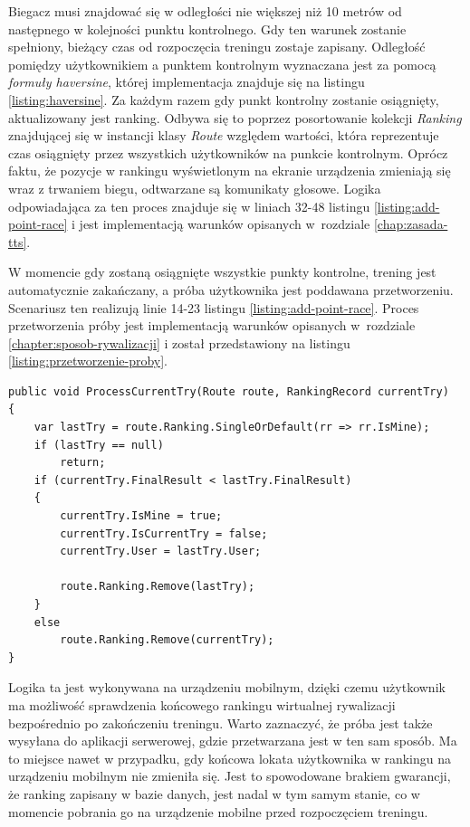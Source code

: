 Biegacz musi znajdować się w odległości nie większej niż 10 metrów od następnego w kolejności punktu kontrolnego. Gdy ten warunek zostanie spełniony, bieżący czas od rozpoczęcia treningu zostaje zapisany. Odległość pomiędzy użytkownikiem a punktem kontrolnym wyznaczana jest za pomocą \textit{formuły haversine}, której implementacja znajduje się na listingu \ref{listing:haversine}. Za każdym razem gdy punkt kontrolny zostanie osiągnięty, aktualizowany jest ranking. Odbywa się to poprzez posortowanie kolekcji \textit{Ranking} znajdującej się w instancji klasy \textit{Route} względem wartości, która reprezentuje czas osiągnięty przez wszystkich użytkowników na punkcie kontrolnym. Oprócz faktu, że pozycje w rankingu wyświetlonym na ekranie urządzenia zmieniają się wraz z trwaniem biegu, odtwarzane są komunikaty głosowe. Logika odpowiadająca za ten proces znajduje się w liniach 32-48 listingu \ref{listing:add-point-race} i jest implementacją warunków opisanych w~rozdziale \ref{chap:zasada-tts}.

W momencie gdy zostaną osiągnięte wszystkie punkty kontrolne, trening jest automatycznie zakańczany, a próba użytkownika jest poddawana przetworzeniu. Scenariusz ten realizują linie 14-23 listingu \ref{listing:add-point-race}. Proces przetworzenia próby jest implementacją warunków opisanych w~rozdziale \ref{chapter:sposob-rywalizacji} i został przedstawiony na listingu \ref{listing:przetworzenie-proby}.\\
\begin{lstlisting}[caption={Przetworzenie próby użytkownika},label=listing:przetworzenie-proby]
public void ProcessCurrentTry(Route route, RankingRecord currentTry)
{
    var lastTry = route.Ranking.SingleOrDefault(rr => rr.IsMine);
    if (lastTry == null) 
        return;
    if (currentTry.FinalResult < lastTry.FinalResult)
    {
        currentTry.IsMine = true;
        currentTry.IsCurrentTry = false;
        currentTry.User = lastTry.User;

        route.Ranking.Remove(lastTry);
    }
    else
        route.Ranking.Remove(currentTry);
}
\end{lstlisting}
Logika ta jest wykonywana na urządzeniu mobilnym, dzięki czemu użytkownik ma możliwość sprawdzenia końcowego rankingu wirtualnej rywalizacji bezpośrednio po zakończeniu treningu. Warto zaznaczyć, że próba jest także wysyłana do aplikacji serwerowej, gdzie przetwarzana jest w ten sam sposób. Ma to miejsce nawet w przypadku, gdy końcowa lokata użytkownika w rankingu na urządzeniu mobilnym nie zmieniła się. Jest to spowodowane brakiem gwarancji, że ranking zapisany w bazie danych, jest nadal w tym samym stanie, co w momencie pobrania go na urządzenie mobilne przed rozpoczęciem treningu.

